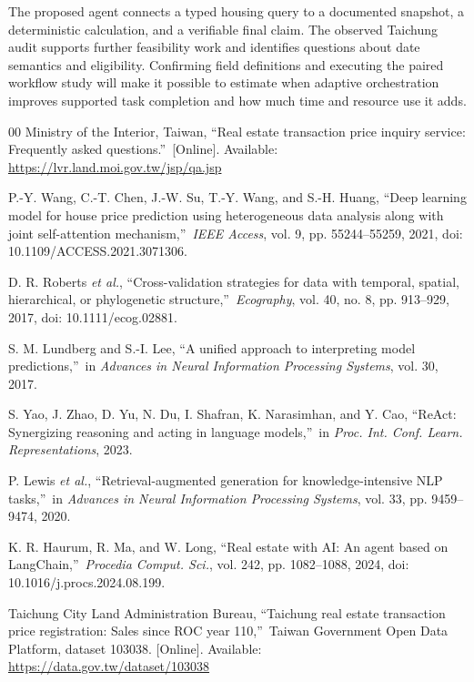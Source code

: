 \documentclass[conference]{IEEEtran}
\begin{document}
The proposed agent connects a typed housing query to a documented snapshot, a deterministic calculation, and a verifiable final claim. The observed Taichung audit supports further feasibility work and identifies questions about date semantics and eligibility. Confirming field definitions and executing the paired workflow study will make it possible to estimate when adaptive orchestration improves supported task completion and how much time and resource use it adds.

\begin{thebibliography}{00}
Ministry of the Interior, Taiwan, \textquotedblleft Real estate transaction price inquiry service: Frequently asked questions.\textquotedblright\ [Online]. Available: \url{https://lvr.land.moi.gov.tw/jsp/qa.jsp}

P.-Y. Wang, C.-T. Chen, J.-W. Su, T.-Y. Wang, and S.-H. Huang, \textquotedblleft Deep learning model for house price prediction using heterogeneous data analysis along with joint self-attention mechanism,\textquotedblright\ \emph{IEEE Access}, vol. 9, pp. 55244--55259, 2021, doi: 10.1109/ACCESS.2021.3071306.

D. R. Roberts \emph{et al.}, \textquotedblleft Cross-validation strategies for data with temporal, spatial, hierarchical, or phylogenetic structure,\textquotedblright\ \emph{Ecography}, vol. 40, no. 8, pp. 913--929, 2017, doi: 10.1111/ecog.02881.

S. M. Lundberg and S.-I. Lee, \textquotedblleft A unified approach to interpreting model predictions,\textquotedblright\ in \emph{Advances in Neural Information Processing Systems}, vol. 30, 2017.

S. Yao, J. Zhao, D. Yu, N. Du, I. Shafran, K. Narasimhan, and Y. Cao, \textquotedblleft ReAct: Synergizing reasoning and acting in language models,\textquotedblright\ in \emph{Proc. Int. Conf. Learn. Representations}, 2023.

P. Lewis \emph{et al.}, \textquotedblleft Retrieval-augmented generation for knowledge-intensive NLP tasks,\textquotedblright\ in \emph{Advances in Neural Information Processing Systems}, vol. 33, pp. 9459--9474, 2020.

K. R. Haurum, R. Ma, and W. Long, \textquotedblleft Real estate with AI: An agent based on LangChain,\textquotedblright\ \emph{Procedia Comput. Sci.}, vol. 242, pp. 1082--1088, 2024, doi: 10.1016/j.procs.2024.08.199.

Taichung City Land Administration Bureau, \textquotedblleft Taichung real estate transaction price registration: Sales since ROC year 110,\textquotedblright\ Taiwan Government Open Data Platform, dataset 103038. [Online]. Available: \url{https://data.gov.tw/dataset/103038}
\end{thebibliography}
\end{document}
